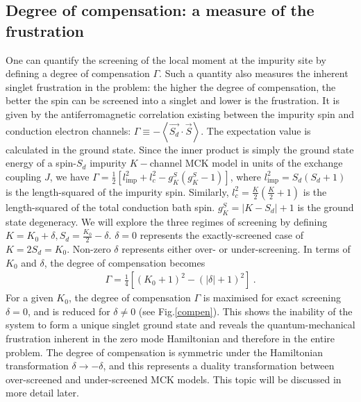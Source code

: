 \documentclass{iopart}
\begin{document}
\subsection{Degree of compensation: a measure of the frustration}
\label{sec:deg_of_comp}
One can quantify the screening of the local moment at the impurity site by defining a degree of compensation \(\Gamma\). Such a quantity also measures the inherent singlet frustration in the problem: the higher the degree of compensation, the better the spin can be screened into a singlet and lower is the frustration. It is given by the antiferromagnetic correlation existing between the impurity spin and conduction electron channels: $\Gamma \equiv - \left< \vec{S_d}\cdot \vec{S}\right>$.
The expectation value is calculated in the ground state. Since the inner product is simply the ground state energy of a spin-\(S_{d}\) impurity \(K-\)channel MCK model in units of the exchange coupling \(J\), we have \(\Gamma = \frac{1}{2} \left[ l_\mathrm{imp}^2 + l_c^2 - g^S_K\left( g^S_K - 1 \right)\right]\), where \(l_\mathrm{imp}^2 = S_d(S_d+1)\) is the length-squared of the impurity spin. Similarly, \(l_c^2 = \frac{K}{2}\left(\frac{K}{2} + 1\right) \) is the length-squared of the total conduction bath spin. \(g^S_K = |K - S_d| + 1\) is the ground state degeneracy. We will explore the three regimes of screening by defining \(K = K_0 + \delta, S_{d} = \frac{K_0}{2} - \delta\). \(\delta=0\) represents the exactly-screened case of \(K = 2S_{d} = K_0\). Non-zero \(\delta\) represents either over- or under-screening. In terms of \(K_0\) and \(\delta\), the degree of compensation becomes
\begin{eqnarray}
	\label{gamma}
	\Gamma = \frac{1}{4}\left[\left( K_0 + 1 \right) ^2 - \left(|\delta| + 1 \right) ^2\right]~.
\end{eqnarray}
{For a given \(K_0\), the degree of compensation $\Gamma$ is maximised for exact screening \(\delta=0\), and is reduced for \(\delta \neq 0\) (see Fig.\ref{compen}). This shows the inability of the system to form a unique singlet ground state and reveals the quantum-mechanical frustration inherent in the zero mode Hamiltonian and therefore in the entire problem.} The degree of compensation is symmetric under the Hamiltonian transformation \(\delta \to -\delta\), and this represents a duality transformation between over-screened and under-screened MCK models. This topic will be discussed in more detail later.
\end{document}
